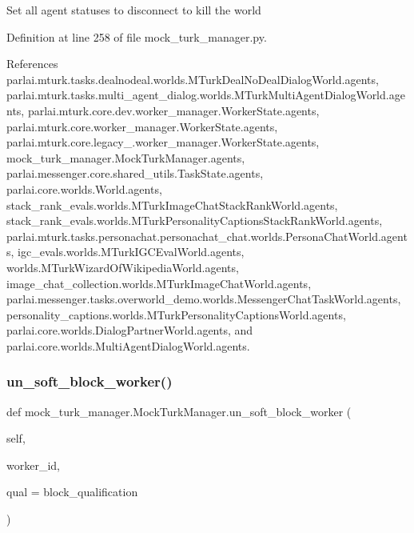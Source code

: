 \begin{DoxyVerb}Set all agent statuses to disconnect to kill the world\end{DoxyVerb}
 

Definition at line 258 of file mock\+\_\+turk\+\_\+manager.\+py.



References parlai.\+mturk.\+tasks.\+dealnodeal.\+worlds.\+M\+Turk\+Deal\+No\+Deal\+Dialog\+World.\+agents, parlai.\+mturk.\+tasks.\+multi\+\_\+agent\+\_\+dialog.\+worlds.\+M\+Turk\+Multi\+Agent\+Dialog\+World.\+agents, parlai.\+mturk.\+core.\+dev.\+worker\+\_\+manager.\+Worker\+State.\+agents, parlai.\+mturk.\+core.\+worker\+\_\+manager.\+Worker\+State.\+agents, parlai.\+mturk.\+core.\+legacy\+\_.\+worker\+\_\+manager.\+Worker\+State.\+agents, mock\+\_\+turk\+\_\+manager.\+Mock\+Turk\+Manager.\+agents, parlai.\+messenger.\+core.\+shared\+\_\+utils.\+Task\+State.\+agents, parlai.\+core.\+worlds.\+World.\+agents, stack\+\_\+rank\+\_\+evals.\+worlds.\+M\+Turk\+Image\+Chat\+Stack\+Rank\+World.\+agents, stack\+\_\+rank\+\_\+evals.\+worlds.\+M\+Turk\+Personality\+Captions\+Stack\+Rank\+World.\+agents, parlai.\+mturk.\+tasks.\+personachat.\+personachat\+\_\+chat.\+worlds.\+Persona\+Chat\+World.\+agents, igc\+\_\+evals.\+worlds.\+M\+Turk\+I\+G\+C\+Eval\+World.\+agents, worlds.\+M\+Turk\+Wizard\+Of\+Wikipedia\+World.\+agents, image\+\_\+chat\+\_\+collection.\+worlds.\+M\+Turk\+Image\+Chat\+World.\+agents, parlai.\+messenger.\+tasks.\+overworld\+\_\+demo.\+worlds.\+Messenger\+Chat\+Task\+World.\+agents, personality\+\_\+captions.\+worlds.\+M\+Turk\+Personality\+Captions\+World.\+agents, parlai.\+core.\+worlds.\+Dialog\+Partner\+World.\+agents, and parlai.\+core.\+worlds.\+Multi\+Agent\+Dialog\+World.\+agents.

\mbox{\label{classmock__turk__manager_1_1MockTurkManager_ae7d3ae75de08b2e3d74413418a6d9602}} 
\subsubsection{\texorpdfstring{un\+\_\+soft\+\_\+block\+\_\+worker()}{un\_soft\_block\_worker()}}
{\footnotesize\ttfamily def mock\+\_\+turk\+\_\+manager.\+Mock\+Turk\+Manager.\+un\+\_\+soft\+\_\+block\+\_\+worker (\begin{DoxyParamCaption}\item[{}]{self,  }\item[{}]{worker\+\_\+id,  }\item[{}]{qual = {\ttfamily \textquotesingle{}block\+\_\+qualification\textquotesingle{}} }\end{DoxyParamCaption})}



